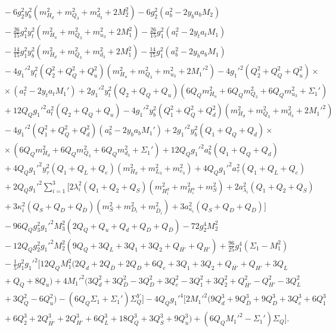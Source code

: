 \documentclass[preprint,amsmath,amssymb,aps,superscriptaddress,prd,showpacs,floatfix,nofootinbib]{revtex4-1}
\begin{document}
\begin{subequations}
\begin{align}
&{}-6g_2^2y_b^2\left ( m_{H_d}^2+m_{Q_3}^2+m_{d_3}^2+2M_2^2\right )-6g_2^2\left ( a_b^2-2y_ba_bM_2\right )\nonumber\\
&{}-\frac{26}{15}g_1^2y_t^2\left ( m_{H_u}^2+m_{Q_3}^2+m_{u_3}^2+2M_1^2\right )-\frac{26}{15}g_1^2\left ( a_t^2-2y_ta_tM_1\right )\nonumber\\
&{}-\frac{14}{15}g_1^2y_b^2\left ( m_{H_d}^2+m_{Q_3}^2+m_{d_3}^2+2M_1^2\right )-\frac{14}{15}g_1^2\left ( a_b^2-2y_ba_bM_1\right )\nonumber\\
&{}-4g_1'^2y_t^2\left ( Q_2^2+Q_Q^2+Q_u^2\right )\left ( m_{H_u}^2+m_{Q_3}^2+m_{u_3}^2+2M_1'^2\right )-4g_1'^2\left ( Q_2^2+Q_Q^2+Q_u^2\right )\times\nonumber\\
&{}\times\left ( a_t^2-2y_ta_tM_1'\right )+2g_1'^2y_t^2\left ( Q_2+Q_Q+Q_u\right )\left ( 6Q_Qm_{H_u}^2+6Q_Qm_{Q_3}^2+6Q_Qm_{u_3}^2+\Sigma_1'\right )\nonumber\\
&{}+12Q_Qg_1'^2a_t^2\left ( Q_2+Q_Q+Q_u\right )-4g_1'^2y_b^2\left ( Q_1^2+Q_Q^2+Q_d^2\right )\left ( m_{H_d}^2+m_{Q_3}^2+m_{d_3}^2+2M_1'^2\right )\nonumber\\
&{}-4g_1'^2\left ( Q_1^2+Q_Q^2+Q_d^2\right )\left ( a_b^2-2y_ba_bM_1'\right )+2g_1'^2y_b^2\left ( Q_1+Q_Q+Q_d\right )\times\nonumber\\
&{}\times\left ( 6Q_Qm_{H_d}^2+6Q_Qm_{Q_3}^2+6Q_Qm_{d_3}^2+\Sigma_1'\right )+12Q_Qg_1'^2a_b^2\left ( Q_1+Q_Q+Q_d\right )\nonumber\\
&{}+4Q_Qg_1'^2y_\tau^2\left (Q_1+Q_L+Q_e\right )\left ( m_{H_d}^2+m_{L_3}^2+m_{e_3}^2\right )+4Q_Qg_1'^2a_\tau^2\left ( Q_1+Q_L+Q_e\right )\nonumber\\
&{}+2Q_Qg_1'^2\sum_{i=1}^3\Big [ 2\lambda_i^2\left ( Q_1+Q_2+Q_S\right )\left ( m_{H_i^d}^2+m_{H_i^u}^2+m_S^2\right )+2a_{\lambda_i}^2\left ( Q_1+Q_2+Q_S\right )\nonumber\\
&{}+3\kappa_i^2\left ( Q_S+Q_D+Q_{\overline{D}}\right )\left ( m_S^2+m_{D_i}^2+m_{\overline{D}_i}^2\right )+3a_{\kappa_i}^2\left ( Q_S+Q_D+Q_{\overline{D}}\right )\Big ]\nonumber\\
&{}-96Q_Qg_3^2g_1'^2M_3^2\left ( 2Q_Q+Q_u+Q_d+Q_D+Q_{\overline{D}}\right )-72g_2^4M_2^2\nonumber\\
&{}-12Q_Qg_2^2g_1'^2M_2^2\left ( 9Q_Q+3Q_L+3Q_1+3Q_2+Q_{\overline{H'}}+Q_{H'}\right )+\frac{96}{25}g_1^4\left ( \Sigma_1-M_1^2\right )\nonumber\\
&{}-\frac{1}{5}g_1^2g_1'^2\big [ 12Q_QM_1^2\big ( 2Q_d+2Q_{\overline{D}}+2Q_D+6Q_e+3Q_1+3Q_2+Q_{\overline{H'}}+Q_{H'}+3Q_L\nonumber\\
&{}+Q_Q+8Q_u\big )+4M_1'^2\big ( 3Q_d^2+3Q_{\overline{D}}^2-3Q_D^2+3Q_e^2-3Q_1^2+3Q_2^2+Q_{\overline{H'}}^2-Q_{H'}^2-3Q_L^2\nonumber\\
&{}+3Q_Q^2-6Q_u^2\big )-\left ( 6Q_Q\Sigma_1+\Sigma_1'\right )\Sigma_Q^Y\big ]-4Q_Qg_1'^4\big [ 2M_1'^2\big ( 9Q_d^3+9Q_{\overline{D}}^3+9Q_D^3+3Q_e^3+6Q_1^3\nonumber\\
&{}+6Q_2^3+2Q_{\overline{H'}}^3+2Q_{H'}^3+6Q_L^3+18Q_Q^3+3Q_S^3+9Q_u^3\big )+\left ( 6Q_QM_1'^2-\Sigma_1'\right )\Sigma_Q\big ].\label{eq:USSMmq222Ot2Coeff}
\end{align}
\end{subequations}
\end{document}
